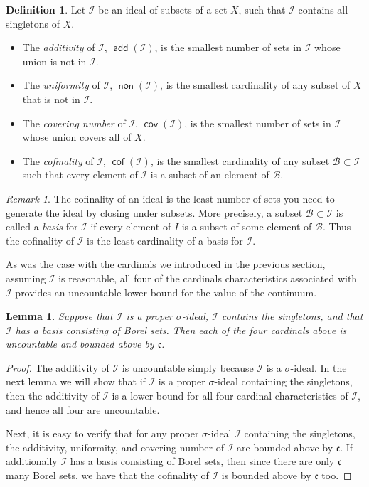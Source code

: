\documentclass[11pt,oneside]{amsbook}
\DeclareMathOperator{\add}{\mathsf{add}}
\DeclareMathOperator{\non}{\mathsf{non}}
\DeclareMathOperator{\cov}{\mathsf{cov}}
\DeclareMathOperator{\cof}{\mathsf{cof}}
\theoremstyle{definition}
\theoremstyle{plain}
\newtheorem{lem}[thm]{Lemma}
\theoremstyle{definition}
\newtheorem{defn}[thm]{Definition}
\theoremstyle{remark}
\newtheorem{rem}[thm]{Remark}
\begin{document}
\begin{defn} Let $\mathcal I$ be an ideal of subsets of a set $X$, such that $\mathcal I$ contains all singletons of $X$. 
  \begin{itemize}
  \item The \emph{additivity} of $\mathcal{I}$, $\add(\mathcal{I})$, is the smallest number of sets in $\mathcal{I}$ whose union is not in $\mathcal{I}$.
  \item The \emph{uniformity} of $\mathcal{I}$, $\non(\mathcal{I})$, is the smallest cardinality of any subset of $X$ that is not in $\mathcal{I}$.
  \item The \emph{covering number} of $\mathcal{I}$, $\cov(\mathcal{I})$, is the smallest number of sets in $\mathcal{I}$ whose union covers all of $X$.
  \item The \emph{cofinality} of $\mathcal{I}$, $\cof(\mathcal{I})$, is the smallest cardinality of any subset $\mathcal{B}\subset\mathcal{I}$ such that every element of $\mathcal{I}$ is a subset of an element of $\mathcal{B}$.
  \end{itemize}
\end{defn}

\begin{rem}
The cofinality of an ideal is the least number of sets you need to generate the ideal by closing under subsets. More precisely, a subset $\mathcal B\subset\mathcal I$ is called a \emph{basis} for $\mathcal I$ if every element of $I$ is a subset of some element of $\mathcal B$. Thus the cofinality of $\mathcal I$ is the least cardinality of a basis for $\mathcal I$.
\end{rem}

As was the case with the cardinals we introduced in the previous section, assuming $\mathcal I$ is reasonable, all four of the cardinals characteristics associated with $\mathcal I$ provides an uncountable lower bound for the value of the continuum.

\begin{lem}
  \label{lem:ideal-cards}
  Suppose that $\mathcal I$ is a proper $\sigma$-ideal, $\mathcal I$ contains the singletons, and that $\mathcal I$ has a basis consisting of Borel sets. Then each of the four cardinals above is uncountable and bounded above by $\mathfrak c$.
\end{lem}

\begin{proof}
  The additivity of $\mathcal I$ is uncountable simply because $\mathcal I$ is a $\sigma$-ideal. In the next lemma we will show that if $\mathcal I$ is a proper $\sigma$-ideal containing the singletons, then the additivity of $\mathcal I$ is a lower bound for all four cardinal characteristics of $\mathcal I$, and hence all four are uncountable.

  Next, it is easy to verify that for any proper $\sigma$-ideal $\mathcal I$ containing the singletons, the additivity, uniformity, and covering number of $\mathcal I$ are bounded above by $\mathfrak c$. If additionally $\mathcal I$ has a basis consisting of Borel sets, then since there are only $\mathfrak c$ many Borel sets, we have that the cofinality of $\mathcal I$ is bounded above by $\mathfrak c$ too.
\end{proof}
\end{document}

